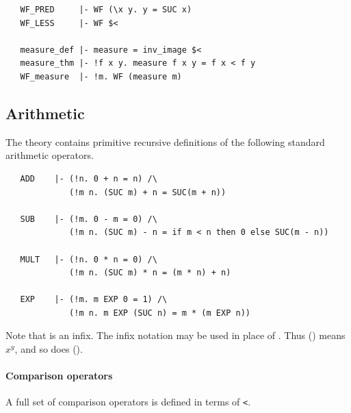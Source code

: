 \begin{hol}
\begin{verbatim}
   WF_PRED     |- WF (\x y. y = SUC x)
   WF_LESS     |- WF $<

   measure_def |- measure = inv_image $<
   measure_thm |- !f x y. measure f x y = f x < f y
   WF_measure  |- !m. WF (measure m)
\end{verbatim}
\end{hol}


\subsection{Arithmetic}

The \HOL{} theory  contains primitive recursive
definitions of the following standard arithmetic operators.

\begin{hol}
\begin{verbatim}
   ADD    |- (!n. 0 + n = n) /\
             (!m n. (SUC m) + n = SUC(m + n))

   SUB    |- (!m. 0 - m = 0) /\
             (!m n. (SUC m) - n = if m < n then 0 else SUC(m - n))

   MULT   |- (!n. 0 * n = 0) /\
             (!m n. (SUC m) * n = (m * n) + n)

   EXP    |- (!m. m EXP 0 = 1) /\
             (!m n. m EXP (SUC n) = m * (m EXP n))
\end{verbatim}
\end{hol}
%
Note that  is an infix. The infix notation
\holtxt{**} may be used in place of \holtxt{EXP}. Thus
() means $x^y$, and so does ().

\paragraph{Comparison operators}

A full set of comparison operators is defined in terms of \verb+<+.

